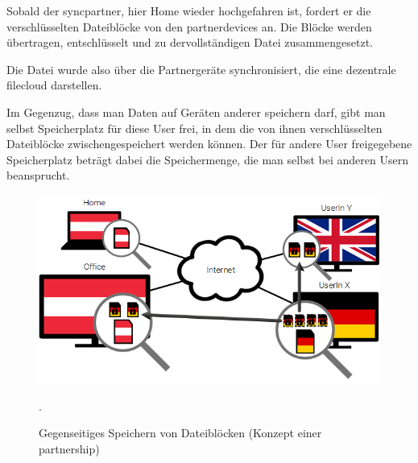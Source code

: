 Sobald der \gls{syncpartner}, hier Home wieder hochgefahren ist, fordert er die
verschlüsselten Dateiblöcke von den \glspl{partnerdevice} an. Die Blöcke werden
übertragen, entschlüsselt und zu dervollständigen Datei zusammengesetzt.

Die Datei wurde also über die Partnergeräte synchronisiert, die eine dezentrale
\gls{filecloud} darstellen.

Im Gegenzug, dass man Daten auf Geräten anderer speichern darf, gibt man selbst
Speicherplatz für diese User frei, in dem die von ihnen verschlüsselten
Dateiblöcke zwischengespeichert werden können. Der für andere User freigegebene
Speicherplatz beträgt dabei die Speichermenge, die man selbst bei anderen Usern
beansprucht.

\begin{figure}[h]
	\centering
  \includegraphics[]{images/sblit_3}
  \caption{Gegenseitiges Speichern von Dateiblöcken (Konzept einer \gls{partnership})}.
\end{figure}
